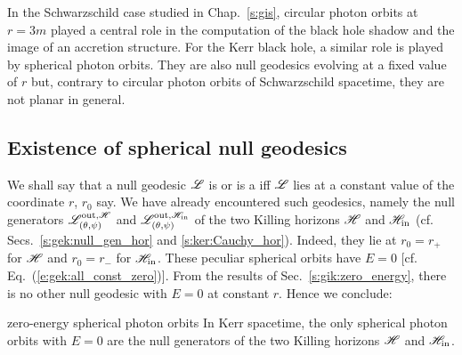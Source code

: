 In the Schwarzschild case studied in Chap.~\ref{s:gis}, circular photon
orbits at $r=3m$ played a central role in the computation of
the black hole shadow and the image of an accretion structure.
For the Kerr black hole, a similar role is played by spherical photon
orbits. They are also null geodesics evolving at a fixed value of $r$ but, contrary
to circular photon orbits of Schwarzschild spacetime, they are not planar
in general.


\subsection{Existence of spherical null geodesics} \label{s:gik:spher_existence}

We shall say that a null geodesic $\mathscr{L}$ is  or
is a  iff $\mathscr{L}$ lies at a constant value of the coordinate $r$, $r_0$ say.
We have already encountered such geodesics, namely the null generators
$\mathscr{L}^{{\rm out},\mathscr{H}}_{(\theta,\psi)}$ and $\mathscr{L}^{{\rm out},\mathscr{H}_{\rm in}}_{(\theta,\psi)}$
of the two Killing horizons
$\mathscr{H}$ and $\mathscr{H}_{\rm in}$ (cf. Secs.~\ref{s:gek:null_gen_hor} and \ref{s:ker:Cauchy_hor}).
Indeed, they lie at $r_0 = r_+$ for
$\mathscr{H}$ and $r_0 = r_-$ for $\mathscr{H}_{\rm in}$.  These peculiar spherical orbits have $E=0$
[cf. Eq.~(\ref{e:gek:all_const_zero})].
From the results of Sec.~\ref{s:gik:zero_energy}, there is no other null geodesic with $E=0$ at constant $r$.
Hence we conclude:
\begin{tprop}{zero-energy spherical photon orbits}{}
In Kerr spacetime, the only spherical photon orbits with $E=0$ are the null generators of the two Killing horizons $\mathscr{H}$ and $\mathscr{H}_{\rm in}$.
\end{tprop}

